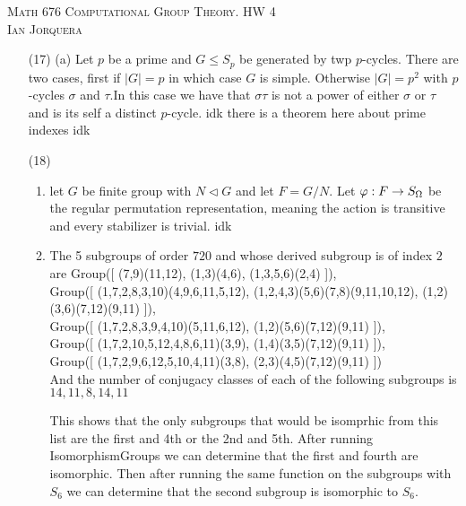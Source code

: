 \documentclass[12pt]{amsart}
\begin{document}
\begin{center}
   \textsc{Math 676 Computational Group Theory. HW 4\\ Ian Jorquera}
\end{center}
\vspace{1em}

\begin{itemize}
   \item[(17)] (a) Let $p$ be a prime and $G\leq S_p$ be generated by twp $p$-cycles. 
   There are two cases, first if $|G|=p$ in which case $G$ is simple. Otherwise $|G|=p^2$
   with $p$-cycles $\sigma$ and $\tau$.In this case we have that $\sigma\tau$ is not a 
   power of either $\sigma$ or $\tau$ and is its self a distinct $p$-cycle. idk there is a theorem here about prime indexes
   idk

   
   \item[(18)] 
   \begin{enumerate}[label= (\alph*)]
      \item let $G$ be finite group with $N\triangleleft G$ and let $F=G/N$.
      Let $\varphi:F\rightarrow S_\Omega$ be the regular permutation representation, meaning the action is transitive and every stabilizer is trivial.
      idk


      \item The 5 subgroups of order $720$ and whose derived subgroup is of index $2$ are
      Group([ (7,9)(11,12), (1,3)(4,6), (1,3,5,6)(2,4) ]),\\
      Group([ (1,7,2,8,3,10)(4,9,6,11,5,12), (1,2,4,3)(5,6)(7,8)(9,11,10,12), (1,2)(3,6)(7,12)(9,11) ]),\\
      Group([ (1,7,2,8,3,9,4,10)(5,11,6,12), (1,2)(5,6)(7,12)(9,11) ]),\\
      Group([ (1,7,2,10,5,12,4,8,6,11)(3,9), (1,4)(3,5)(7,12)(9,11) ]),\\
      Group([ (1,7,2,9,6,12,5,10,4,11)(3,8), (2,3)(4,5)(7,12)(9,11) ])\\

      And the number of conjugacy classes of each of the 
      following subgroups is $14, 11, 8, 14, 11$

      This shows that the only subgroups that would be isomprhic from this list are the first and 4th or the 2nd and 5th.
      After running IsomorphismGroups we can determine that the first and fourth are isomorphic.
      Then after running the same function on the subgroups with $S_6$ we can determine that the second subgroup is isomorphic to $S_6$.




\end{enumerate}
\end{itemize}
\end{document}
